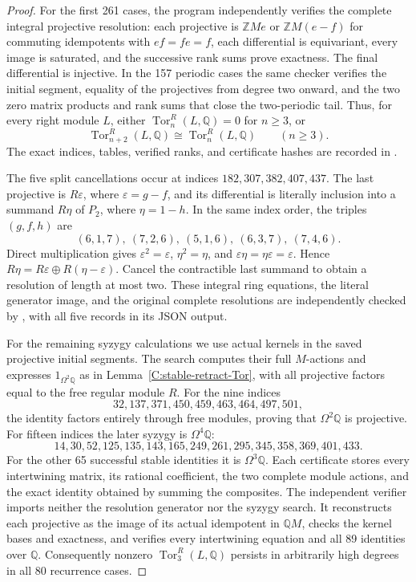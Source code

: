 \begin{proof}
For the first 261 cases, the program
 independently verifies the
complete integral projective resolution: each projective is
$\mathbb ZM e$ or $\mathbb ZM(e-f)$ for commuting idempotents
with $ef=fe=f$, each differential is equivariant, every image
is saturated, and the successive rank sums prove exactness.
The final differential is injective. In the 157 periodic cases
the same checker verifies the initial segment, equality of the
projectives from degree two onward, and the two zero matrix
products and rank sums that close the two-periodic tail.
Thus, for every right module $L$, either
$\operatorname{Tor}_n^R(L,\mathbb Q)=0$ for $n\geq3$, or
\[
 \operatorname{Tor}_{n+2}^R(L,\mathbb Q)
 \cong\operatorname{Tor}_n^R(L,\mathbb Q)\qquad(n\geq3).
\]
The exact indices, tables, verified ranks, and certificate
hashes are recorded in
.

The five split cancellations occur at indices
$182,307,382,407,437$. The last projective is $R\varepsilon$,
where $\varepsilon=g-f$, and its differential is literally
inclusion into a summand $R\eta$ of $P_2$, where $\eta=1-h$.
In the same index order, the triples $(g,f,h)$ are
\[
 (6,1,7),\ (7,2,6),\ (5,1,6),\ (6,3,7),\ (7,4,6).
\]
Direct multiplication gives
$\varepsilon^2=\varepsilon$, $\eta^2=\eta$, and
$\varepsilon\eta=\eta\varepsilon=\varepsilon$.
Hence $R\eta=R\varepsilon\oplus R(\eta-\varepsilon)$.
Cancel the contractible last summand to obtain a resolution
of length at most two. These integral ring equations, the
literal generator image, and the original complete resolutions
are independently checked by
, with all five
records in its JSON output.

For the remaining syzygy calculations we use actual kernels
in the saved projective initial segments. The search
 computes their full
$M$-actions and expresses $1_{\Omega^2\mathbb Q}$ as in
Lemma~\ref{C:stable-retract-Tor}, with all projective factors
equal to the free regular module $R$.
For the nine indices
\[
 32,137,371,450,459,463,464,497,501,
\]
the identity factors entirely through free modules, proving
that $\Omega^2\mathbb Q$ is projective.
For fifteen indices the later syzygy is $\Omega^4\mathbb Q$:
\[
 14,30,52,125,135,143,165,249,261,295,345,358,369,401,433.
\]
For the other 65 successful stable identities it is
$\Omega^3\mathbb Q$. Each certificate stores every intertwining
matrix, its rational coefficient, the two complete module
actions, and the exact identity obtained by summing the
composites. The independent verifier
 imports neither the resolution
generator nor the syzygy search. It reconstructs each
projective as the image of its actual idempotent in $\mathbb QM$,
checks the kernel bases and exactness, and verifies every
intertwining equation and all 89 identities over $\mathbb Q$.
Consequently nonzero $\operatorname{Tor}_3^R(L,\mathbb Q)$
persists in arbitrarily high degrees in all 80 recurrence cases.


\end{proof}

